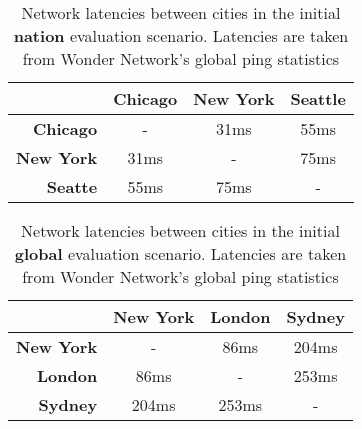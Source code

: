 \begin{table}[]
\centering
\begin{tabular}{r|ccc}
\multicolumn{1}{c|}{} & \textbf{Chicago} & \textbf{New York} & \textbf{Seattle} \\ \hline
\textbf{Chicago}      & -                & 31ms              & 55ms             \\
\textbf{New York}     & 31ms             & -                 & 75ms             \\
\textbf{Seatte}       & 55ms             & 75ms              & -                \\ \hline
\end{tabular}
\caption{Network latencies between cities in the initial \textbf{nation} evaluation scenario. Latencies are taken from Wonder Network's global ping statistics\cite{wondernetworkGlobalPingStatistics}}
\label{tab:initial_nation_pings}
\end{table}

\begin{table}[]
\centering
\begin{tabular}{r|ccc}
\multicolumn{1}{c|}{} & \textbf{New York} & \textbf{London} & \textbf{Sydney} \\ \hline
\textbf{New York}     & -                 & 86ms            & 204ms           \\
\textbf{London}       & 86ms              & -               & 253ms           \\
\textbf{Sydney}       & 204ms             & 253ms           & -               \\ \hline
\end{tabular}

\caption{Network latencies between cities in the initial \textbf{global} evaluation scenario. Latencies are taken from Wonder Network's global ping statistics\cite{wondernetworkGlobalPingStatistics}}
\label{tab:initial_global_pings}
\end{table}